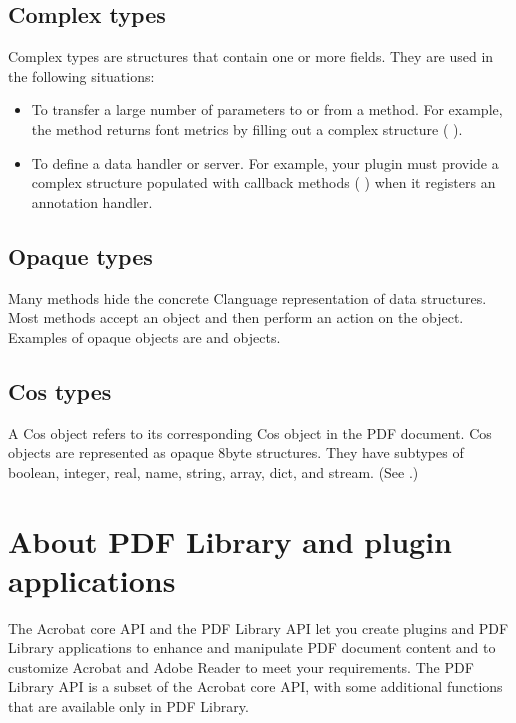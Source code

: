 \documentclass[letterpaper,12pt,english,openany,oneside]{sphinxmanual}
\begin{document}
\subsection{Complex types}
\label{\detokenize{index:complex-types}}
Complex types are structures that contain one or more fields. They are used in the following situations:
\begin{itemize}
\item {} 
To transfer a large number of parameters to or from a method. For example, the  method returns font metrics by filling out a complex structure ( ).

\item {} 
To define a data handler or server. For example, your plugin must provide a complex structure populated with callback methods ( ) when it registers an annotation handler.

\end{itemize}


\subsection{Opaque types}
\label{\detokenize{index:opaque-types}}
Many methods hide the concrete C\sphinxhyphen{}language representation of data structures. Most methods accept an object and then perform an action on the object. Examples of opaque objects are  and  objects.


\subsection{Cos types}
\label{\detokenize{index:cos-types}}
A Cos object refers to its corresponding Cos object in the PDF document. Cos objects are represented as opaque 8\sphinxhyphen{}byte structures. They have subtypes of boolean, integer, real, name, string, array, dict, and stream. (See .)


\section{About PDF Library and plugin applications}
\label{\detokenize{index:about-pdf-library-and-plugin-applications}}
The Acrobat core API and the PDF Library API let you create plugins and PDF Library applications to enhance and manipulate PDF document content and to customize Acrobat and Adobe Reader to meet your requirements. The PDF Library API is a subset of the Acrobat core API, with some additional functions that are available only in PDF Library.
\end{document}
